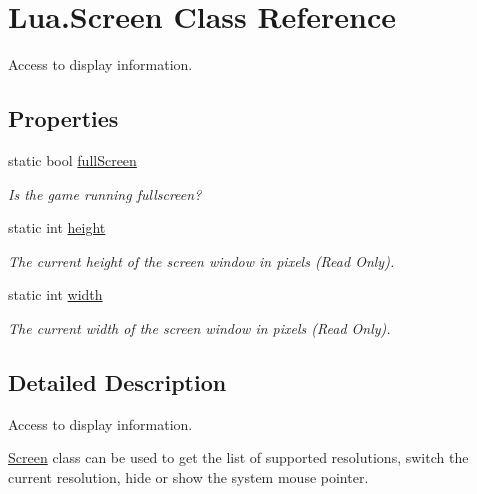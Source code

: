 \hypertarget{class_lua_1_1_screen}{}\section{Lua.\+Screen Class Reference}
\label{class_lua_1_1_screen}


Access to display information.  


\subsection*{Properties}
\begin{DoxyCompactItemize}
\item 
static bool \mbox{\hyperlink{class_lua_1_1_screen_a7b08588981d36493e586b0d59a1f1b7a}{full\+Screen}}
\begin{DoxyCompactList}\small\item\em Is the game running fullscreen? \end{DoxyCompactList}\item 
static int \mbox{\hyperlink{class_lua_1_1_screen_a7e3459d0ccc2641709d1bad599092fdc}{height}}
\begin{DoxyCompactList}\small\item\em The current height of the screen window in pixels (Read Only). \end{DoxyCompactList}\item 
static int \mbox{\hyperlink{class_lua_1_1_screen_ae44386bf8759e8f85e04358297f3dd95}{width}}
\begin{DoxyCompactList}\small\item\em The current width of the screen window in pixels (Read Only). \end{DoxyCompactList}\end{DoxyCompactItemize}


\subsection{Detailed Description}
Access to display information. 

\mbox{\hyperlink{class_lua_1_1_screen}{Screen}} class can be used to get the list of supported resolutions, switch the current resolution, hide or show the system mouse pointer. 


